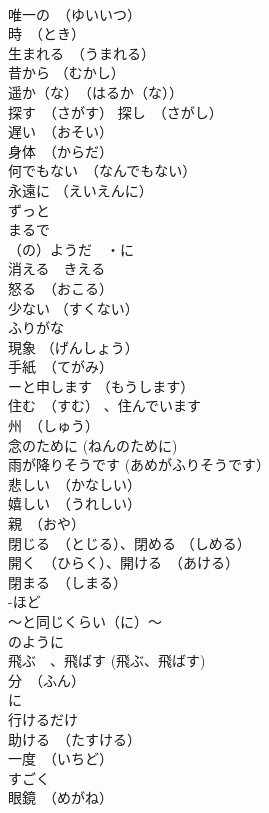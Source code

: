 \documentclass[8pt]{extreport}
\begin{document}
\begin{CJK}{UTF8}{min}
\\	唯一の　（ゆいいつ）	
\\	時　（とき）	
\\	生まれる　（うまれる）	
\\	昔から （むかし）	
\\	遥か（な）　（はるか（な））	
\\	探す　（さがす） 探し　（さがし）	
\\	遅い　（おそい）	
\\	身体　（からだ）	
\\	何でもない　（なんでもない）	
\\	永遠に （えいえんに）	
\\	ずっと	
\\	まるで 
\\	（の）ようだ　・に 
\\	消える　きえる	
\\	怒る　（おこる）	
\\	少ない （すくない）	
\\	ふりがな	
\\	現象 （げんしょう）	
\\	手紙　（てがみ）	
\\	ーと申します （もうします）	
\\	住む　（すむ） 、住んでいます	
\\	州　（しゅう）	
\\	念のために (ねんのために)	
\\	雨が降りそうです (あめがふりそうです）	
\\	悲しい　（かなしい）	
\\	嬉しい　（うれしい）	
\\	親　（おや）	
\\	閉じる　（とじる）、閉める （しめる）	
\\	開く　（ひらく）、開ける　（あける）	
\\	閉まる　（しまる）	
\\	-ほど	
\\	～と同じくらい（に）～	
\\	のように	
\\	飛ぶ　、飛ばす (飛ぶ、飛ばす)	
\\	分　（ふん）	
\\	に　
\\	行けるだけ	
\\	助ける　（たすける）	
\\	一度　（いちど）	
\\	すごく	
\\	眼鏡　（めがね）	

\end{CJK}
\end{document}

